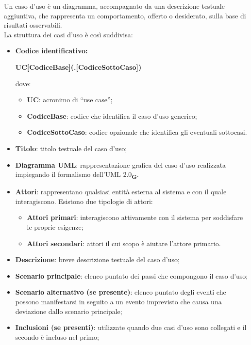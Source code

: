 Un caso d'uso è un diagramma, accompagnato da una descrizione testuale aggiuntiva, che rappresenta un comportamento, offerto o desiderato, sulla base di risultati osservabili.
\\La struttura dei casi d'uso è così suddivisa:
\begin{itemize}
    \item \textbf{Codice identificativo:}
          \begin{center}
              \textbf{UC[CodiceBase](.[CodiceSottoCaso])}
          \end{center}
          dove:
          \begin{itemize}
              \item \textbf{UC}: acronimo di “use case”;
              \item \textbf{CodiceBase}: codice che identifica il caso d'uso generico;
              \item \textbf{CodiceSottoCaso}: codice opzionale che identifica gli eventuali sottocasi.
          \end{itemize}
    \item \textbf{Titolo}: titolo testuale del caso d'uso;
    \item \textbf{Diagramma UML}: rappresentazione grafica del caso d'uso realizzata impiegando il formalismo dell'UML 2.0\textsubscript{\textbf{G}}.
    \item \textbf{Attori}: rappresentano qualsiasi entità esterna al sistema e con il quale interagiscono. Esistono due tipologie di attori:\begin{itemize}
              \item \textbf{Attori primari}: interagiscono attivamente con il sistema per soddisfare le proprie esigenze;
              \item \textbf{Attori secondari}: attori il cui scopo è aiutare l'attore primario.
          \end{itemize}
    \item \textbf{Descrizione}: breve descrizione testuale del caso d'uso;
    \item \textbf{Scenario principale}: elenco puntato dei passi che compongono il caso d'uso;
    \item \textbf{Scenario alternativo (se presente)}: elenco puntato degli eventi che possono manifestarsi in seguito a un evento imprevisto che causa una deviazione dallo scenario principale;
    \item \textbf{Inclusioni (se presenti)}: utilizzate quando due casi d'uso sono collegati e il secondo è incluso nel primo;

\end{itemize}
